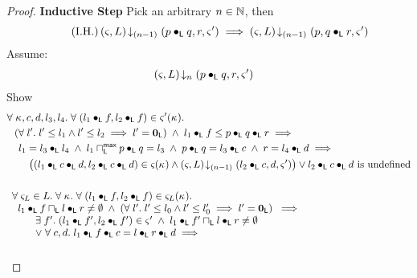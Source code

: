 \begin{lemma}
\begin{proof}
\noindent\textbf{Inductive Step} Pick an arbitrary $n \in \mathbb{N}$, then
%
\begin{equation}
	\tag{I.H.}
	\left(\varsigma_{}, L\right) \!\downarrow_{(n-1)} \left(p \bullet_{\textsf{L}} q, r, \varsigma_{}'\right) \implies 
	\left(\varsigma_{}, L\right) \!\downarrow_{(n-1)} \left(p, q \bullet_{\textsf{L}} r, \varsigma_{}'\right)
\label{L1:IH}
\end{equation}
%
Assume:
%
\begin{align}
	& \left(\varsigma_{}, L\right) \!\downarrow_{n} \left(p \bullet_{\textsf{L}} q, r, \varsigma_{}'\right) \label{L1:Ass1}
\end{align}
%
Show
%
\begin{align}
	&\forall\; \kappa_{}, c, d, l_3, l_4.\; \forall\; (l_1 \bullet_{\textsf{L}} f, l_2 \bullet_{\textsf{L}} f) \in \varsigma_{}'(\kappa_{}).\; \nonumber\\
	&\hspace*{0.2cm}\left(\forall\; l'.\; l' \leq l_1 \land l' \leq l_2 \implies l' = \mathbf{0}_{\textsf{L}}\right)\;\land\; l_1 \bullet_{\textsf{L}} f \leq  p \bullet_{\textsf{L}} q \bullet_{\textsf{L}} r \implies \nonumber\\
	&\hspace*{0.4cm}  l_1 = l_3 \bullet_{\textsf{L}} l_4 \;\land\; l_1 \sqcap_{\textsf{L}}^{\textsf{max}} p \bullet_{\textsf{L}} q = l_3 \;\land\; p \bullet_{\textsf{L}} q = l_3 \bullet_{\textsf{L}} c \;\land\; r = l_4 \bullet_{\textsf{L}} d\implies \nonumber\\
	&\hspace*{0.7cm} \left((l_1 \bullet_{\textsf{L}} c \bullet_{\textsf{L}} d, l_2 \bullet_{\textsf{L}} c \bullet_{\textsf{L}} d) \in \varsigma_{}(\kappa_{}) \land
	\left(\varsigma_{}, L\right) \!\downarrow_{(n-1)} \left(l_2 \bullet_{\textsf{L}} c, d, \varsigma_{}'\right)\right) \lor l_2 \bullet_{\textsf{L}} c \bullet_{\textsf{L}} d \text{ is undefined} \label{L1:Goal1}\\ \nonumber\\
	& \begin{array}{l}
		\forall\; \varsigma_{L} \in L.\; \forall\; \kappa_{}.\; \forall\; (l_1 \bullet_{\textsf{L}} f, l_2 \bullet_{\textsf{L}} f) \in \varsigma_{L}(\kappa_{}).\; \\
  \hspace*{0.2cm} l_1 \bullet_{\textsf{L}} f \sqcap_{\textsf{L}} l \bullet_{\textsf{L}} r \not= \emptyset \;\land\; \left(\forall\; l'.\; l' \leq l_0 \land l' \leq l'_0 \implies l' = \mathbf{0}_{\textsf{L}}\right)  \;\implies\\
  \hspace*{0.8cm}\exists\; f'.\; (l_1 \bullet_{\textsf{L}} f', l_2 \bullet_{\textsf{L}} f') \in \varsigma_{}' \;\land\; l_1 \bullet_{\textsf{L}} f' \sqcap_{\textsf{L}} l \bullet_{\textsf{L}} r \not= \emptyset\\
		\hspace*{0.8cm}\lor\;\forall\; c, d.\;  l_1 \bullet_{\textsf{L}} f \bullet_{\textsf{L}} c = l \bullet_{\textsf{L}} r \bullet_{\textsf{L}} d \implies\\
		\hspace*{1cm}
		\begin{array}{l l}

\end{array}
\end{array}
\end{align}
\end{proof}
\end{lemma}
